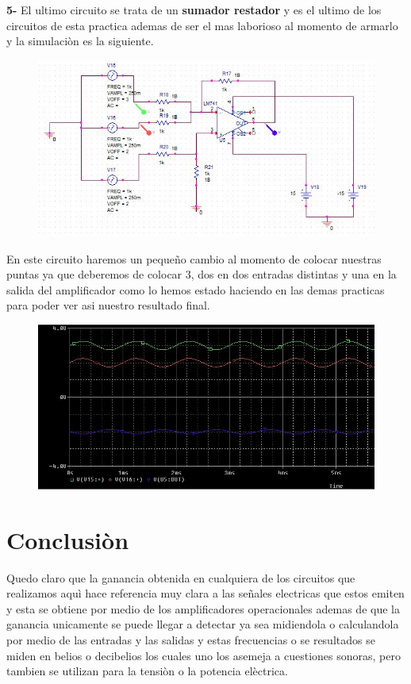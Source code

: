 \documentclass[12pt,a4paper]{article}
\begin{document}
\textbf{5-} El ultimo circuito se trata de un \textbf{sumador restador} y es el ultimo de los circuitos de esta practica ademas de ser el mas laborioso al momento de armarlo y la simulaciòn es la siguiente.

\begin{figure}[h!]
\centering
\includegraphics[scale=1]{SumadorRestador1.png} 
\end{figure}

En este circuito haremos un pequeño cambio al momento de colocar nuestras puntas ya que deberemos de colocar 3, dos en dos entradas distintas y una en la salida del amplificador como lo hemos estado haciendo en las demas practicas para poder ver asi nuestro resultado final.

\begin{figure}[h!]
\centering
\includegraphics[scale=1]{SumadorRestador2.png} 
\end{figure}

\section{Conclusiòn}
Quedo claro que la ganancia obtenida en cualquiera de los circuitos que realizamos aquì hace referencia muy clara a las señales electricas que estos emiten y esta se obtiene por medio de los amplificadores operacionales ademas de que la ganancia unicamente se puede llegar a detectar ya sea midiendola o calculandola por medio de las entradas y las salidas y estas frecuencias o se resultados se miden en belios o decibelios los cuales uno los asemeja a cuestiones sonoras, pero tambien se utilizan para la tensiòn o la potencia elèctrica.
\end{document}
